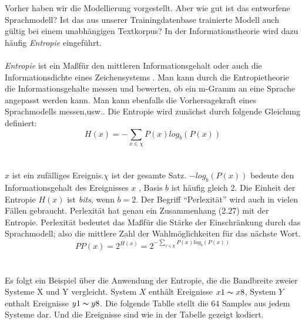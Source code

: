 Vorher haben wir die Modellierung vorgestellt. Aber wie gut ist das entworfene Sprachmodell? Ist das aus unserer Trainingdatenbase trainierte Modell auch g\"ultig bei einem unabh\"angigen Textkorpus? In der Informationstheorie wird dazu h\"aufig \emph{Entropie}  eingef\"uhrt.
\\
\\
\emph{Entropie} ist ein Ma\ss f\"ur den mittleren Informationsgehalt oder auch die Informationsdichte eines Zeichensystems \cite{int_entropie}. Man kann durch die Entropietheorie die Informationsgehalte messen und bewerten, ob ein m-Gramm an eine Sprache angepasst werden kann. Man kann ebenfalls die Vorhersagekraft eines Sprachmodells messen,usw..\cite{book_speech}
Die Entropie wird zun\"achst durch folgende Gleichung definiert:
\begin{equation}
\label{equation:bewertung_01}
H(x)=-\sum_{x\in\chi}P(x)log_{b}(P(x))
\end{equation}
\\
\\
$x$ ist ein zuf\"alliges Ereignis.$\chi$ ist der gesamte Satz. $-log_{b}(P(x))$ bedeute den Informationsgehalt des Ereignisses $x$ , Basis $b$ ist h\"aufig gleich 2. Die Einheit der Entropie $H(x)$ ist \emph{bits}, wenn $b=2$.
Der Begriff "`Perlexit\"at"' wird auch in vielen F\"allen gebraucht. Perlexit\"at hat genau ein Zusammenhang (2.27) mit der Entropie. Perlexit\"at bedeutet das Ma\ss f\"ur die St\"arke der Einschr\"ankung durch das Sprachmodell; also die mittlere Zahl der Wahlm\"oglichkeiten f\"ur das n\"achste Wort.
\begin{equation}
\label{equation:bewertung_02}
PP(x)=2^{H(x)}=2^{-\sum_{x\in\chi}P(x)log_{b}(P(x))}
\end{equation}
\\
\\
Es folgt ein Beispiel \"uber die Anwendung der Entropie, die die Bandbreite zweier Systeme X und Y vergleicht. System $X$ enth\"alt Ereignisse $x1\thicksim x8$, System $Y$ enthalt Ereignisse $y1\thicksim y8$. Die folgende Tablle stellt die 64 Samples aus jedem Systeme dar. Und die Ereignisse sind wie in der Tabelle gezeigt kodiert.
